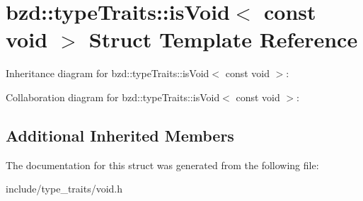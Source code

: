 \hypertarget{structbzd_1_1typeTraits_1_1isVoid_3_01const_01void_01_4}{}\section{bzd\+:\+:type\+Traits\+:\+:is\+Void$<$ const void $>$ Struct Template Reference}
\label{structbzd_1_1typeTraits_1_1isVoid_3_01const_01void_01_4}


Inheritance diagram for bzd\+:\+:type\+Traits\+:\+:is\+Void$<$ const void $>$\+:


Collaboration diagram for bzd\+:\+:type\+Traits\+:\+:is\+Void$<$ const void $>$\+:
\subsection*{Additional Inherited Members}


The documentation for this struct was generated from the following file\+:\begin{DoxyCompactItemize}
\item 
include/type\+\_\+traits/void.\+h\end{DoxyCompactItemize}
